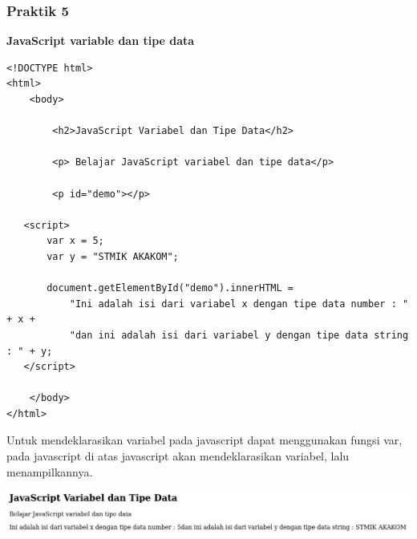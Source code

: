\documentclass[a4paper,12pt]{article}
\begin{document}
\subsubsection{Praktik 5}
\textbf{JavaScript variable dan tipe data\\}
\begin{lstlisting}
<!DOCTYPE html>
<html>
    <body>

        <h2>JavaScript Variabel dan Tipe Data</h2>

        <p> Belajar JavaScript variabel dan tipe data</p>

        <p id="demo"></p>

   <script>
       var x = 5;
       var y = "STMIK AKAKOM";

       document.getElementById("demo").innerHTML =
           "Ini adalah isi dari variabel x dengan tipe data number : " + x +
           "dan ini adalah isi dari variabel y dengan tipe data string : " + y;
   </script>

    </body>
</html>
\end{lstlisting}

Untuk mendeklarasikan variabel pada javascript dapat menggunakan fungsi var, pada javascript di atas javascript akan
mendeklarasikan variabel, lalu menampilkannya.
\begin{center}
    \includegraphics[width=.8\linewidth]{4.png} 
\end{center}
\end{document}
